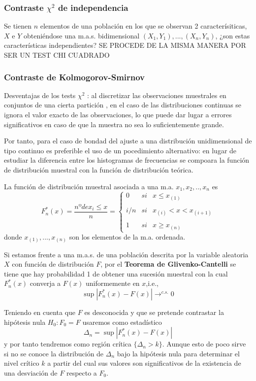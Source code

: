 \documentclass[a4paper,12pt]{article}
\begin{document}
\subsubsection{Contraste $\chi^2$ de independencia}
Se tienen $n$ elementos de una población en los que se observan 2 caracterísiticas, $X$ e $Y$ obteniéndose una m.a.s. bidimensional $(X_1,Y_1),...,(X_n,Y_n)$, ¿son estas características independientes?
SE PROCEDE DE LA MISMA MANERA POR SER UN TEST CHI CUADRADO

\subsubsection{Contraste de Kolmogorov-Smirnov }
Desventajas de los tests $\chi^2$ : al discretizar las observaciones muestrales en conjuntos de una cierta partición , en el caso de las distribuciones continuas se ignora el valor exacto de las observaciones, lo que puede dar lugar a errores significativos en caso de que la muestra no sea lo suficientemente grande.

Por tanto, para el caso de bondad del ajuste a una distribución unidimensional de tipo continuo es preferible el uso de un pocedimiento alternativo: en lugar de estudiar la diferencia entre los histogramas de frecuencias se compoara la función de distribución muestral con la función de distribución teórica.

La función de distribución muestral asociada a  una m.a. $x_1, x_2,..,x_n$ es 
$$F^*_n(x) = \frac{nº de x_i \leq x}{n} = \left\{ \begin{array}{lcc}
             0 &   si  & x \leq x_{(1)} \\
             \\ i/n &  si & x_{(i)} < x < x_{(i+1)} \\
             \\ 1 &  si  & x \geq x_{(n)}
             \end{array}
   \right. $$
donde $x_{(1)},...,x_{(n)}$ son los elementos de la m.a. ordenada.

Si estamos frente a una m.a.s. de una población descrita por la variable aleatoria $X$ con función de distribución $F$, por el \textbf{Teorema de Glivenko-Cantelli} se tiene que hay probabilidad 1 de obtener una sucesión muestral con la cual $F^*_n(x)$ converja a $F(x)$ uniformemente en $x$,i.e.,
$$\sup |F^*_n(x) - F(x)| \longrightarrow^{c.s.} 0$$

Teniendo en cuenta que $F$ es desconocida y que se pretende contrastar la hipótesis nula $H_0 : F_0 = F$ usaremos como estadístico
$$\Delta_n = \sup |F^*_n(x) - F(x)|  $$
y por tanto tendremos como región crítica $\{\Delta_n > k\}$. Aunque esto de poco sirve si no se conoce la distribución de $\Delta_n$ bajo la hipótesis nula para determinar el nivel crítico $k$ a partir del cual sus valores son significativos de la existencia de una desviación de $F$ respecto a $F_0$.
\end{document}
